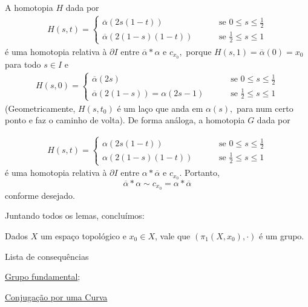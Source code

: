 \begin{dem}
    A homotopia $H$ dada por 
    \begin{align*}
        H(s,t)=\begin{cases}
            \overline{\alpha}(2s(1-t))\qquad &\mbox{ se }0\le s \le \frac{1}{2}\\
            \overline{\alpha}(2(1-s)(1-t)) \qquad &\mbox{ se }\frac{1}{2}\le s\le 1 
        \end{cases}
    \end{align*}
    é uma homotopia relativa à $\partial I$ entre $\overline{\alpha}*\alpha$ e $c_{x_0},$ porque $H(s,1)=\overline{\alpha}(0)=x_0$ para todo $s\in I$ e 
    \begin{align*}
        H(s,0)=\begin{cases}
            \overline{\alpha}(2s)\qquad &\mbox{ se }0\le s \le \frac{1}{2}\\
            \overline{\alpha}(2(1-s))=\alpha(2s-1) \qquad &\mbox{ se }\frac{1}{2}\le s\le 1
        \end{cases}
    \end{align*}
    (Geometricamente, $H(s,t_0)$ é um laço que anda em $\alpha(s),$ para num certo ponto e faz o caminho de volta).
    De forma análoga, a homotopia $G$ dada por 
   
\begin{align*}
        H(s,t)=\begin{cases}
            \alpha(2s(1-t))\qquad &\mbox{ se }0\le s \le \frac{1}{2} \\
            \alpha(2(1-s)(1-t)) \qquad &\mbox{ se }\frac{1}{2}\le s\le 1 
        \end{cases}
    \end{align*}
    é uma homotopia relativa à $\partial I$ entre $\alpha*\overline{\alpha}$ e $c_{x_0}.$ Portanto, $$\overline{\alpha}*\alpha\sim c_{x_0}=\alpha*\overline{\alpha}$$ conforme desejado.
\end{dem}

Juntando todos os lemas, concluímos: 

\begin{thm}
    Dados $X$ um espaço topológico e $x_0\in X$, vale que $(\pi_1(X,x_0),\cdot)$ é um grupo.
\end{thm}

\begin{titlemize}{Lista de consequências}
	\item \hyperref[grupo-fundamental-def]{Grupo fundamental};\\
    \item \hyperref[conjugacao-por-curva-prop]{Conjugação por uma Curva}
\end{titlemize}

